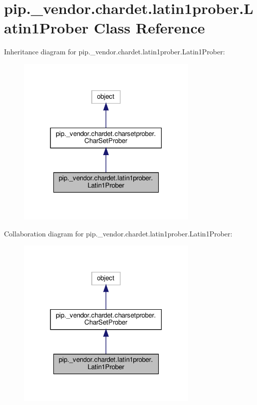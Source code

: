 \hypertarget{classpip_1_1__vendor_1_1chardet_1_1latin1prober_1_1Latin1Prober}{}\section{pip.\+\_\+vendor.\+chardet.\+latin1prober.\+Latin1\+Prober Class Reference}
\label{classpip_1_1__vendor_1_1chardet_1_1latin1prober_1_1Latin1Prober}


Inheritance diagram for pip.\+\_\+vendor.\+chardet.\+latin1prober.\+Latin1\+Prober\+:
\nopagebreak
\begin{figure}[H]
\begin{center}
\leavevmode
\includegraphics[width=247pt]{classpip_1_1__vendor_1_1chardet_1_1latin1prober_1_1Latin1Prober__inherit__graph}
\end{center}
\end{figure}


Collaboration diagram for pip.\+\_\+vendor.\+chardet.\+latin1prober.\+Latin1\+Prober\+:
\nopagebreak
\begin{figure}[H]
\begin{center}
\leavevmode
\includegraphics[width=247pt]{classpip_1_1__vendor_1_1chardet_1_1latin1prober_1_1Latin1Prober__coll__graph}
\end{center}
\end{figure}
